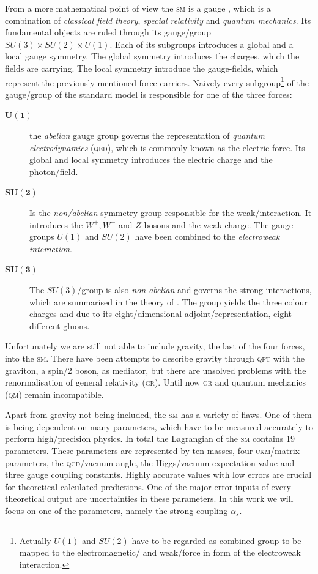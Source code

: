 \documentclass[../../index.tex]{subfiles}
\begin{document}
From a more mathematical point of view the \textsc{sm} is a gauge
, which is a combination of \textit{classical
  field theory}, \textit{special relativity} and \textit{quantum mechanics}. Its
fundamental objects are ruled through its gauge\-/group \(SU(3)\times
SU(2)\times U(1)\). Each of its subgroups introduces a global and a local gauge
symmetry. The global symmetry introduces the charges, which the fields are
carrying. The local symmetry introduce the gauge-fields, which represent the
previously mentioned force carriers. Naively every subgroup\footnote{Actually
  \(U(1)\) and \(SU(2)\) have to be regarded as combined group to be mapped to
  the electromagnetic\-/ and weak\-/force in form of the electroweak
  interaction.} of the gauge\-/group of the standard model is responsible for
one of the three forces:
\begin{description}
\item[\(\bm{U(1)}\)] the \textit{abelian} gauge group governs the representation
  of \textit{quantum electrodynamics} (\textsc{qed}), which is commonly known as
  the electric force. Its global and local symmetry introduces the electric
  charge and the photon\-/field.
\item[\(\bm{SU(2)}\)] Is the \textit{non\-/abelian} symmetry group responsible
  for the weak\-/interaction. It introduces the \(W^+,W^-\) and \(Z\) bosons and
  the weak charge. The gauge groups \(U(1)\) and \(SU(2)\) have been combined to
  the \textit{electroweak interaction}.
\item[\(\bm{SU(3)}\)] The \(SU(3)\)\-/group is also \textit{non-abelian} and
  governs the strong interactions, which are summarised in the theory of
  . The group yields the three colour
  charges and due to its eight\-/dimensional adjoint\-/representation, eight
  different gluons.
\end{description}
Unfortunately we are still not able to include gravity, the last of the four
forces, into the \textsc{sm}. There have been attempts to describe gravity
through \textsc{qft} with the graviton, a spin\-/2 boson, as mediator, but there
are unsolved problems with the renormalisation of general relativity
(\textsc{gr}). Until now \textsc{gr} and quantum mechanics (\textsc{qm}) remain
incompatible.

Apart from gravity not being included, the \textsc{sm} has a variety of flaws.
One of them is being dependent on many parameters, which have to be measured
accurately to perform high\-/precision physics. In total the Lagrangian of the
\textsc{sm} contains 19 parameters. These parameters are represented by ten
masses, four \textsc{ckm}\-/matrix parameters, the \textsc{qcd}\-/vacuum angle,
the Higgs\-/vacuum expectation value and three gauge coupling constants. Highly
accurate values with low errors are crucial for theoretical calculated
predictions. One of the major error inputs of every theoretical output are
uncertainties in these parameters. In this work we will focus on one of the
parameters, namely the strong coupling \(\alpha_s\).
\end{document}
